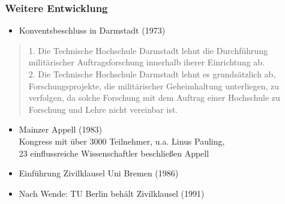 \documentclass[presentation]{beamer}
\begin{document}
\begin{frame}
\frametitle{Weitere Entwicklung}
\label{sec-1-3}
\begin{itemize}

\item Konventsbeschluss in Darmstadt (1973)
\label{sec-1-3-1}%
\end{itemize} %
\begin{quote} %
\label{sec-1-3-2}

    \small 1. Die Technische Hochschule Darmstadt lehnt die Durchführung militärischer Auftragsforschung innerhalb iherer Einrichtung ab.\\2. Die Technische Hochschule Darmstadt lehnt es grundsätzlich ab, Forschungsprojekte, die militärischer Geheimhaltung unterliegen, zu verfolgen, da solche Forschung mit dem Auftrag einer Hochschule zu Forschung und Lehre nicht vereinbar ist.
\pause
\end{quote}
\begin{itemize}

\item Mainzer Appell (1983)\\
\label{sec-1-3-3}%
Kongress mit über 3000 Teilnehmer, u.a. Linus Pauling, \\ 23 einflussreiche Wissenschaftler beschließen Appell

\item Einführung Zivilklausel Uni Bremen (1986)
\label{sec-1-3-4}%

\item Nach Wende: TU Berlin behält Zivilklausel (1991)
\label{sec-1-3-5}%

\end{itemize} %
\end{frame}
\end{document}
